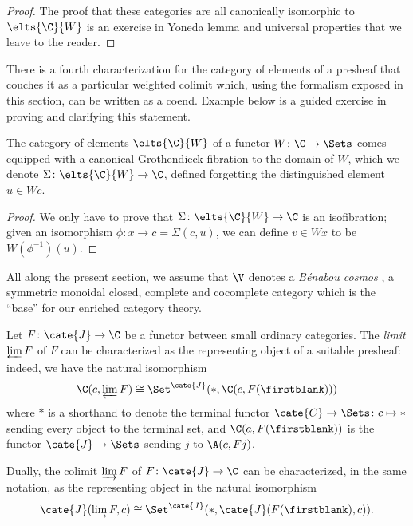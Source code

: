 \begin{proof}
The proof that these categories are all canonically isomorphic to $\elts{\C}{W}$ is an exercise in Yoneda lemma and universal properties that we leave to the reader.
\end{proof}
\begin{remark}
There is a fourth characterization for the category of elements of a presheaf that couches it as a particular weighted colimit which, using the formalism exposed in this section, can be written as a coend. Example  below is a guided exercise in proving and clarifying this statement.
\end{remark}
\begin{proposition}\label{fibelem}
The category of elements $\elts{\C}{W}$ of a functor $W\colon \C\to \Sets$ comes equipped with a canonical Grothendieck fibration \cite[\adef{}]{Bor2} to the domain of $W$, which we denote $\Sigma\colon \elts{\C}{W}\to \C$, defined forgetting the distinguished element $u\in Wc$. 
\end{proposition}
\begin{proof}
We only have to prove that $\Sigma \colon \elts{\C}{W}\to \C$ is an isofibration; given an isomorphism $\phi\colon x\to c=\Sigma(c,u)$, we can define $v\in Wx$ to be $W(\phi^{-1})(u)$.
\end{proof}
\begin{notat}\label{cosmo}
All along the present section, we assume that $\V$ denotes a \emph{B\'enabou cosmos} \cite[???]{cosmo-ref}, \ie a symmetric monoidal closed, complete and cocomplete category which is the ``base'' for our enriched category theory.
\end{notat}
\begin{remark}
Let $F\colon \cate{J}\to\C$ be a functor between small ordinary categories. The \emph{limit} $\varprojlim F$ of $F$ can be characterized as the representing object of a suitable presheaf: indeed, we have the natural isomorphism
\[
\C(c, \varprojlim F)\cong \Set^\cate{J}(*, \C(c,F(\firstblank)))
\]
where $*$ is a shorthand to denote the terminal functor $\cate{C}\to \Sets \colon c\mapsto *$ sending every object to the terminal set, and $\C(a,F(\firstblank))$ is the functor $\cate{J}\to \Sets$ sending $j$ to $\A(c, Fj)$.

Dually, the colimit $\varinjlim F$ of $F\colon \cate{J}\to \C$ can be characterized, in the same notation, as the representing object in the natural isomorphism
\[
\cate{J}(\varinjlim F,c)\cong \Set^\cate{J}(*, \cate{J}(F(\firstblank),c)).
\]
\end{remark}
